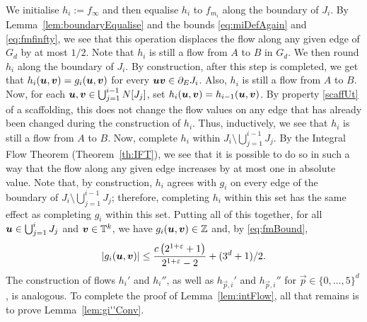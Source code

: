 \documentclass[12pt,a4paper]{amsart}
\numberwithin{equation}{section}
\theoremstyle{definition}
\begin{document}
We initialise $h_i:=f_\infty$ and then equalise $h_i$ to $f_{m_i}$ along the boundary of $J_i$. By Lemma~\ref{lem:boundaryEqualise} and the bounds \eqref{eq:miDefAgain} and \eqref{eq:fmfinfty}, we see that this operation displaces the flow along any given edge of $G_d$ by at most $1/2$. Note that $h_i$ is still a flow from $A$ to $B$ in $G_d$.  We then round $h_i$ along the boundary of $J_i$. By construction, after this step is completed, we get that $h_i(\boldsymbol{u},\boldsymbol{v})=g_i(\boldsymbol{u},\boldsymbol{v})$ for every $\boldsymbol{u}\boldsymbol{v}\in\partial_E J_i$. Also, $h_i$ is still a flow from $A$ to $B$. Now, for each $\boldsymbol{u},\boldsymbol{v}\in \bigcup_{j=1}^{i-1}N[J_j]$, set $h_i(\boldsymbol{u},\boldsymbol{v})=h_{i-1}(\boldsymbol{u},\boldsymbol{v})$. By property \eqref{scaffUt} of a scaffolding, this does not change the flow values on any edge that has already been changed during the construction of $h_i$. Thus, inductively, we see that $h_i$ is still a flow from $A$ to $B$. Now, complete $h_i$ within $J_i\setminus \bigcup_{j=1}^{i-1}J_j$. By the Integral Flow Theorem (Theorem~\ref{th:IFT}), we see that it is possible to do so in such a way that the flow along any given edge increases by at most one in absolute value. Note that, by construction, $h_i$ agrees with $g_i$ on every edge of the boundary of $J_i\setminus \bigcup_{j=1}^{i-1}J_j$; therefore, completing $h_i$ within this set has the same effect as completing $g_i$ within this set.  Putting all of this together, for all $\boldsymbol{u}\in \bigcup_{j=1}^iJ_j$ and $\boldsymbol{v}\in\mathbb{T}^k$, we have $g_i(\boldsymbol{u},\boldsymbol{v})\in \mathbb{Z}$ and, by \eqref{eq:fmBound}, 
\[|g_i(\boldsymbol{u},\boldsymbol{v})| \leq \frac{c\left(2^{1+\varepsilon}+1\right)}{2^{1+\varepsilon}-2} +(3^d+1)/2.\]
The construction of flows $h_i'$ and $h_i''$, as well as $h_{\vec{p},i}'$ and $h_{\vec{p},i}''$ for $\vec{p}\in\{0,\dots,5\}^d$, is analogous. To complete the proof of Lemma~\ref{lem:intFlow}, all that remains is to prove Lemma~\ref{lem:gi''Conv}. 
\end{document}
